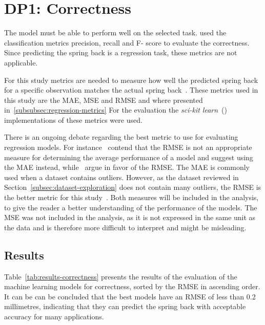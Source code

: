 \section{DP1: Correctness}\label{sec:dp1:-correctness}

The model must be able to perform well on the selected task.
\cite{siebert2022construction} used the classification metrics precision, recall and F-
score to evaluate the correctness.
Since predicting the spring back is a regression task, these metrics are not applicable.

For this study metrics are needed to measure how well the predicted spring back for a specific observation
matches the actual spring back~\cite[p. 29]{hastie2009elements}.
These metrics used in this study are the MAE, MSE and RMSE and where presented in~\cref{subsubsec:regression-metrics}
For the evaluation the \textit{sci-kit learn}~(\cite{scikit-learn}) implementations of these metrics were used.

There is an ongoing debate regarding the best metric to use for evaluating regression models.
For instance~\cite{willmott2005advantages} contend that the RMSE is not an appropriate measure for determining the
average performance of a model and suggest using the MAE instead, while~\cite{chai2014root} argue in favor of the RMSE.
The MAE is commonly used when a dataset contains outliers.
However, as the dataset reviewed in Section~\ref{subsec:dataset-exploration} does not contain many outliers, the
RMSE is the better metric for this study~\cite[p. 1249]{chai2014root}.
Both measures will be included in the analysis, to give the reader a better understanding of the performance of
the models.
The MSE was not included in the analysis, as it is not expressed in the same unit as the data and is therefore
more difficult to interpret and might be misleading.

\subsection{Results}\label{subsec:results}
Table~\ref{tab:results-correctness} presents the results of the evaluation of the machine learning models for
correctness, sorted by the RMSE in ascending order.
It can be can be concluded that the best models have an RMSE of less than 0.2 millimetres, indicating that they can
predict the
spring back with acceptable accuracy for many applications.


